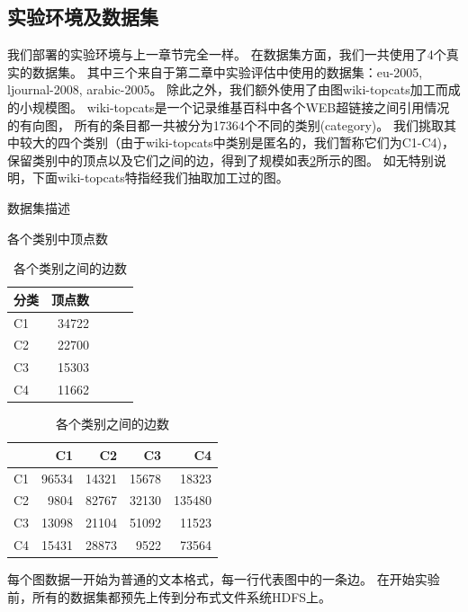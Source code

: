 \documentclass[master]{njuthesis}
\begin{document}
\subsection{实验环境及数据集}
我们部署的实验环境与上一章节完全一样。
在数据集方面，我们一共使用了4个真实的数据集。
其中三个来自于第二章中实验评估中使用的数据集：eu-2005, ljournal-2008, arabic-2005。
除此之外，我们额外使用了由图wiki-topcats\footnotemark[1]加工而成的小规模图。
wiki-topcats是一个记录维基百科中各个WEB超链接之间引用情况的有向图，
所有的条目都一共被分为17364个不同的类别(category)。
我们挑取其中较大的四个类别（由于wiki-topcats中类别是匿名的，我们暂称它们为C1-C4)，
保留类别中的顶点以及它们之间的边，得到了规模如表\ref{tab:dataset3}所示的图。
如无特别说明，下面wiki-topcats特指经我们抽取加工过的图。
\begin{table}[h]
\caption{数据集描述}
\label{tab:dataset3}
\centering
\begin{subtable}{.4\linewidth}
      \centering
        \caption{各个类别中顶点数}
       \begin{tabular}{|l|r|r|r|r|}
\hline
\textbf{分类} & \textbf{顶点数}  \\
\hline
C1 & \num{34722}     \\
\hline
C2 & \num{22700}     \\
\hline
C3 & \num{15303}     \\
\hline
C4 & \num{11662}     \\
\hline
\end{tabular}
    \end{subtable}%
   \begin{subtable}{.6\linewidth}
      \centering
        \caption{各个类别之间的边数}
       \begin{tabular}{|l|r|r|r|r|}
\hline
 & \textbf{C1} & \textbf{C2} & \textbf{C3} & \textbf{C4} \\
\hline
C1 & \num{96534} &  \num{14321} & \num{15678}   & \num{18323} \\
\hline
C2 & \num{9804}  & \num{82767}& \num{32130} &\num{135480} \\
\hline
C3 & \num{13098}  &\num{21104} &\num{51092}  &\num{11523}\\
\hline
C4 & \num{15431}   & \num{28873}& \num{9522} & \num{73564}\\
\hline
\end{tabular}
    \end{subtable}%
\end{table}

每个图数据一开始为普通的文本格式，每一行代表图中的一条边。
在开始实验前，所有的数据集都预先上传到分布式文件系统HDFS上。
\end{document}
